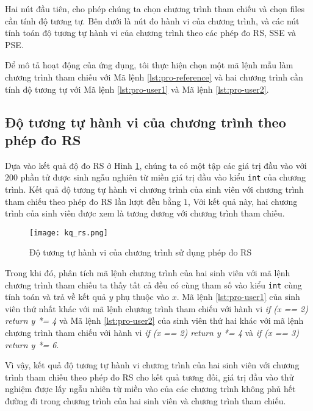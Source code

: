 Hai nút đầu tiên, cho phép chúng ta chọn chương trình tham chiếu và chọn files cần 
tính độ tương tự. Bên dưới là nút đo hành vi của chương trình, và các nút tính 
toán độ tương tự hành vi của chương trình theo các phép đo RS, SSE và PSE.

Để mô tả hoạt động của ứng dụng, tôi thực hiện chọn một mã lệnh mẫu làm chương 
trình tham chiếu với Mã lệnh \ref{lst:pro-reference} và hai chương trình cần 
tính độ tương tự với Mã lệnh \ref{lst:pro-user1} và Mã lệnh \ref{lst:pro-user2}.






\subsection{Độ tương tự hành vi của chương trình theo phép đo RS}
Dựa vào kết quả độ đo RS ở Hình \ref{fig:result-RS}, chúng ta có một tập các 
giá trị đầu vào với $ 200 $ phần tử được sinh ngẫu nghiên từ miền giá trị đầu vào 
kiểu \texttt{int} của chương trình. Kết quả độ tương tự hành vi chương trình của 
sinh viên với chương trình tham chiếu theo phép đo RS lần lượt đều bằng $ 1 $, 
Với kết quả này, hai chương trình của sinh viên được xem là tương đương với 
chương trình tham chiếu. 

\begin{figure}[H]	
	\begin{center}
		\texttt{[image: kq\_rs.png]}
	\end{center}
	\caption{Độ tương tự hành vi của chương trình sử dụng phép đo RS}
	\label{fig:result-RS}
\end{figure}


Trong khi đó, phân tích mã lệnh chương trình của hai sinh viên với mã lệnh chương 
trình tham chiếu ta thấy tất cả đều có cùng tham số vào kiểu \texttt{int} cùng 
tính toán và trả về kết quả $ y $ phụ thuộc vào $ x $. Mã lệnh \ref{lst:pro-user1} 
của sinh viên thứ nhất khác với mã lệnh chương trình tham chiếu với hành vi 
\textit{if (x == 2) return y *= 4} và Mã lệnh \ref{lst:pro-user2} của sinh viên 
thứ hai khác với mã lệnh chương trình tham chiếu với hành vi 
\textit{if (x == 2) return y *= 4} và \textit{if (x == 3) return y *= 6}.

Vì vậy, kết quả độ tương tự hành vi chương trình của hai sinh viên với chương trình 
tham chiếu theo phép đo RS cho kết quả tương đối, giá trị đầu vào thử nghiệm được 
lấy ngẫu nhiên từ miền vào của các chương trình không phủ hết đường đi trong chương 
trình của hai sinh viên và chương trình tham chiếu.

